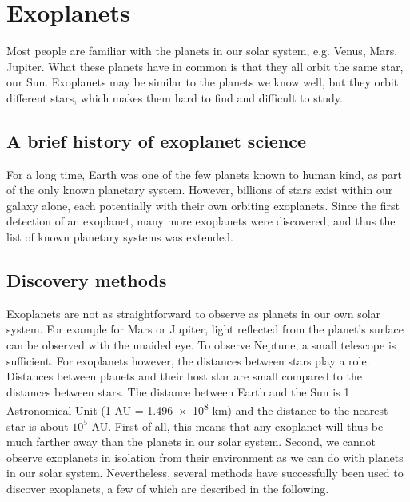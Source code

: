 
\section{Exoplanets}

Most people are familiar with the planets in our solar system, e.g. Venus, Mars, Jupiter. What these planets have in common is that they all orbit the same star, our Sun. Exoplanets may be similar to the planets we know well, but they orbit different stars, which makes them hard to find and difficult to study.

\subsection{A brief history of exoplanet science}
For a long time, Earth was one of the few planets known to human kind, as part of the only known planetary system. However, billions of stars exist within our galaxy alone, each potentially with their own orbiting exoplanets. Since the first detection of an exoplanet, many more exoplanets were discovered, and thus the list of known planetary systems was extended.  


\subsection{Discovery methods}
\label{sec:disc_methods}
Exoplanets are not as straightforward to observe as planets in our own solar system. For example for Mars or Jupiter, light reflected from the planet's surface can be observed with the unaided eye. To observe Neptune, a small telescope is sufficient. For exoplanets however, the distances between stars play a role. Distances between planets and their host star are small compared to the distances between stars. The distance between Earth and the Sun is 1 Astronomical Unit (1 AU = \num{1.496e8} km) and the distance to the nearest star is about $10^5$ AU. First of all, this means that any exoplanet will thus be much farther away than the planets in our solar system. Second, we cannot observe exoplanets in isolation from their environment as we can do with planets in our solar system. Nevertheless, several methods have successfully been used to discover exoplanets, a few of which are described in the following.

